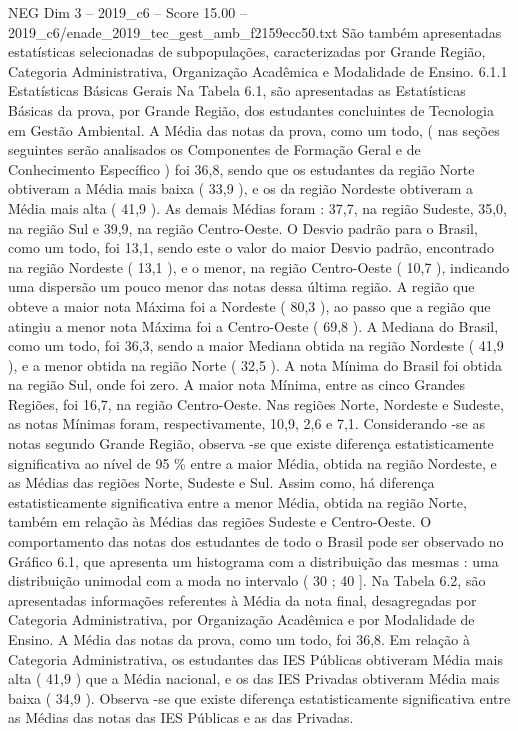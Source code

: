 \begin{textsample}{NEG Dim 3 – 2019\_c6 – Score 15.00 – 2019\_c6/enade\_2019\_tec\_gest\_amb\_f2159ecc50.txt}
São também apresentadas estatísticas selecionadas de subpopulações, caracterizadas por Grande Região, Categoria Administrativa, Organização Acadêmica e Modalidade de Ensino. 6.1.1 Estatísticas Básicas Gerais Na Tabela 6.1, são apresentadas as Estatísticas Básicas da prova, por Grande Região, dos estudantes concluintes de Tecnologia em Gestão Ambiental.
A Média das notas da prova, como um todo, ( nas seções seguintes serão analisados os Componentes de Formação Geral e de Conhecimento Específico ) foi 36,8, sendo que os estudantes da região Norte obtiveram a Média mais baixa ( 33,9 ), e os da região Nordeste obtiveram a Média mais alta ( 41,9 ).
As demais Médias foram : 37,7, na região Sudeste, 35,0, na região Sul e 39,9, na região Centro-Oeste.
O Desvio padrão para o Brasil, como um todo, foi 13,1, sendo este o valor do maior Desvio padrão, encontrado na região Nordeste ( 13,1 ), e o menor, na região Centro-Oeste ( 10,7 ), indicando uma dispersão um pouco menor das notas dessa última região.
A região que obteve a maior nota Máxima foi a Nordeste ( 80,3 ), ao passo que a região que atingiu a menor nota Máxima foi a Centro-Oeste ( 69,8 ).
A Mediana do Brasil, como um todo, foi 36,3, sendo a maior Mediana obtida na região Nordeste ( 41,9 ), e a menor obtida na região Norte ( 32,5 ).
A nota Mínima do Brasil foi obtida na região Sul, onde foi zero.
A maior nota Mínima, entre as cinco Grandes Regiões, foi 16,7, na região Centro-Oeste.
Nas regiões Norte, Nordeste e Sudeste, as notas Mínimas foram, respectivamente, 10,9, 2,6 e 7,1.
Considerando -se as notas segundo Grande Região, observa -se que existe diferença estatisticamente significativa ao nível de 95 \% entre a maior Média, obtida na região Nordeste, e as Médias das regiões Norte, Sudeste e Sul.
Assim como, há diferença estatisticamente significativa entre a menor Média, obtida na região Norte, também em relação às Médias das regiões Sudeste e Centro-Oeste.
O comportamento das notas dos estudantes de todo o Brasil pode ser observado no Gráfico 6.1, que apresenta um histograma com a distribuição das mesmas : uma distribuição unimodal com a moda no intervalo ( 30 ; 40 ].
Na Tabela 6.2, são apresentadas informações referentes à Média da nota final, desagregadas por Categoria Administrativa, por Organização Acadêmica e por Modalidade de Ensino.
A Média das notas da prova, como um todo, foi 36,8.
Em relação à Categoria Administrativa, os estudantes das IES Públicas obtiveram Média mais alta ( 41,9 ) que a Média nacional, e os das IES Privadas obtiveram Média mais baixa ( 34,9 ).
Observa -se que existe diferença estatisticamente significativa entre as Médias das notas das IES Públicas e as das Privadas.

\end{textsample}
